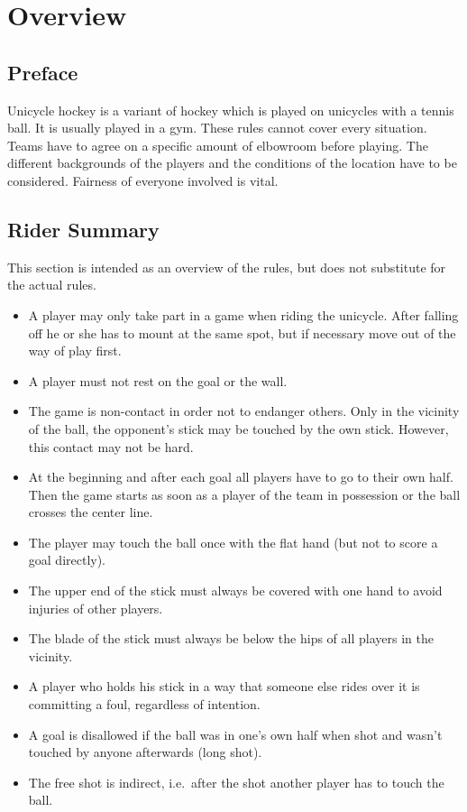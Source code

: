 \chapter{Overview}

\section{Preface}

Unicycle hockey is a variant of hockey which is played on unicycles with a tennis ball.
It is usually played in a gym.
These rules cannot cover every situation.
Teams have to agree on a specific amount of elbowroom before playing.
The different backgrounds of the players and the conditions of the location have to be considered.
Fairness of everyone involved is vital.

\section{Rider Summary}

This section is intended as an overview of the rules, but does not substitute for the actual rules.
\begin{itemize}
\item A player may only take part in a game when riding the unicycle.
 After falling off he or she has to mount at the same spot, but if necessary move out of the way of play first.
\item A player must not rest on the goal or the wall.
\item The game is non-contact in order not to endanger others.
  Only in the vicinity of the ball, the opponent's stick may be touched by the own stick.
  However, this contact may not be hard.
\item At the beginning and after each goal all players have to go to their own half.
  Then the game starts as soon as a player of the team in possession or the ball crosses the center line.
\item The player may touch the ball once with the flat hand (but not to score a goal directly).
\item The upper end of the stick must always be covered with one hand to avoid injuries of other players.
\item The blade of the stick must always be below the hips of all players in the vicinity.
\item A player who holds his stick in a way that someone else rides over it is committing a foul, regardless of intention.
\item A goal is disallowed if the ball was in one's own half when shot and wasn't touched by anyone afterwards (long shot).
\item The free shot is indirect, i.e.\ after the shot another player has to touch the ball.
\end{itemize}
